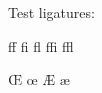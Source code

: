 \documentclass{article}
\begin{document}
Test ligatures:

ff fi fl ffi ffl

\OE{} \oe{} \AE{} \ae{}

\IJ{} \ij{}
\end{document}
